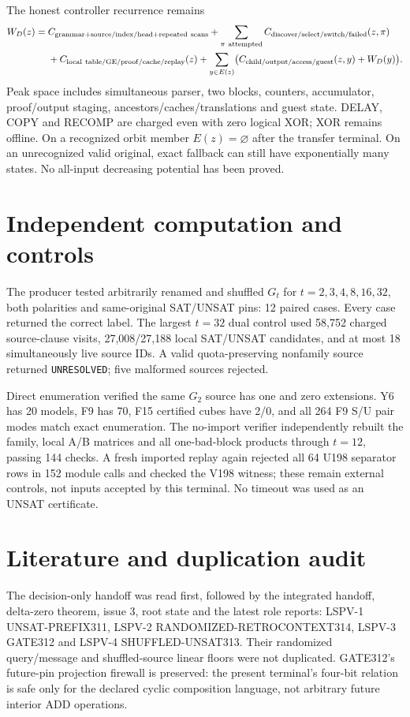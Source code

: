\documentclass[11pt]{article}
\begin{document}
The honest controller recurrence remains
\[
\begin{aligned}
W_D(z)={}&C_{\rm grammar+source/index/head+repeated\ scans}
+\sum_{\pi\ \rm attempted}C_{\rm discover/select/switch/failed}(z,\pi)\\
&+C_{\rm local\ table/GE/proof/cache/replay}(z)
+\sum_{y\in E(z)}\bigl(C_{\rm child/output/access/guest}(z,y)+W_D(y)\bigr).
\end{aligned}
\]
Peak space includes simultaneous parser, two blocks, counters, accumulator,
proof/output staging, ancestors/caches/translations and guest state.  DELAY, COPY
and RECOMP are charged even with zero logical XOR; XOR remains offline.  On a
recognized orbit member $E(z)=\varnothing$ after the transfer terminal.  On an
unrecognized valid original, exact fallback can still have exponentially many
states.  No all-input decreasing potential has been proved.

\section{Independent computation and controls}
The producer tested arbitrarily renamed and shuffled $G_t$ for
$t=2,3,4,8,16,32$, both polarities and same-original SAT/UNSAT pins: 12 paired
cases.  Every case returned the correct label.  The largest $t=32$ dual control
used 58,752 charged source-clause visits, 27,008/27,188 local SAT/UNSAT candidates,
and at most 18 simultaneously live source IDs.  A valid quota-preserving nonfamily
source returned \texttt{UNRESOLVED}; five malformed sources rejected.

Direct enumeration verified the same $G_2$ source has one and zero extensions.
Y6 has 20 models, F9 has 70, F15 certified cubes have 2/0, and all 264 F9 S/U
pair modes match exact enumeration.  The no-import verifier independently rebuilt
the family, local A/B matrices and all one-bad-block products through $t=12$, passing
144 checks.  A fresh imported replay again rejected all 64 U198 separator rows in
152 module calls and checked the V198 witness; these remain external controls, not
inputs accepted by this terminal.  No timeout was used as an UNSAT certificate.

\section{Literature and duplication audit}
The decision-only handoff was read first, followed by the integrated handoff,
delta-zero theorem, issue 3, root state and the latest role reports: LSPV-1
UNSAT-PREFIX311, LSPV-2 RANDOMIZED-RETROCONTEXT314, LSPV-3 GATE312 and LSPV-4
SHUFFLED-UNSAT313.  Their randomized query/message and shuffled-source linear
floors were not duplicated.  GATE312's future-pin projection firewall is preserved:
the present terminal's four-bit relation is safe only for the declared cyclic
composition language, not arbitrary future interior ADD operations.
\end{document}
